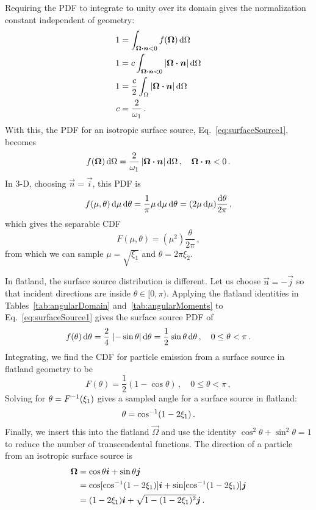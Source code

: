 Requiring the PDF to integrate to unity over its domain gives the
normalization constant independent of geometry:
\begin{align*}
  1 &= \int_{\bm{\Omega}\bm{\cdot} \bm{n} < 0} f(\bm{\Omega}) \mathop{}\!\mathrm{d}\Omega
  \\
  1 &= c \int_{\bm{\Omega}\bm{\cdot} \bm{n} < 0} \left| \bm{\Omega}\bm{\cdot} \bm{n} \right|
    \mathop{}\!\mathrm{d}\Omega
  \\
  1 &=\frac{c}{2} \int_{\Omega} \left| \bm{\Omega}\bm{\cdot} \bm{n} \right| \mathop{}\!\mathrm{d}\Omega
  \\
  c &= \frac{2}{\omega_1}\,.
\end{align*}
With this, the PDF for an isotropic surface source,
Eq.~\eqref{eq:surfaceSource1}, becomes
\begin{equation}\label{eq:surfaceSource2}
  f(\bm{\Omega}) \mathop{}\!\mathrm{d} \Omega = \frac{2}{\omega_1} \left| \bm{\Omega}\bm{\cdot} \bm{n} \right| \mathop{}\!\mathrm{d} \Omega \,,
\quad \bm{\Omega}\bm{\cdot} \bm{n} < 0 \,.
\end{equation}
In 3-D, choosing $\vec{n}=\vec{i}$, this PDF is
\begin{equation*}
  f(\mu,\theta) \mathop{}\!\mathrm{d}\mu \mathop{}\!\mathrm{d}\theta
  = \frac{1}{\pi} \mu \mathop{}\!\mathrm{d}\mu \mathop{}\!\mathrm{d}\theta
  = (2 \mu \mathop{}\!\mathrm{d}\mu) \frac{\mathop{}\!\mathrm{d}\theta}{2\pi}\,,
\end{equation*}
which gives the separable CDF
\begin{equation*}
  F(\mu,\theta) = (\mu^2) \frac{\theta}{2\pi}\,,
\end{equation*}
from which we can sample $\mu=\sqrt{\xi_1}$ and $\theta=2\pi \xi_2$.

In flatland, the surface source distribution is different. Let us choose
$\vec{n} = -\vec{j}$ so that incident directions are inside
$\theta \in [0, \pi)$.
Applying the flatland identities in Tables~\ref{tab:angularDomain}
and~\ref{tab:angularMoments} to Eq.~\eqref{eq:surfaceSource1} gives the surface
source PDF of
\begin{equation*}
  f(\theta) \mathop{}\!\mathrm{d}\theta = \frac{2}{4} \, \left|  -\sin \theta \right|\mathop{}\!\mathrm{d}\theta
  = \frac{1}{2} \sin \theta\mathop{}\!\mathrm{d}\theta \,,\quad 0 \le \theta < \pi\,.
\end{equation*}
Integrating, we find the CDF for particle emission from
a surface source in flatland geometry to be
\begin{equation}\label{eq:surfaceSourceFlatland}
  F(\theta) = \frac{1}{2} \left( 1-\cos\theta \right)
  \,,\quad 0 \le \theta < \pi\,,
\end{equation}
Solving for $\theta = F^{-1}(\xi_1)$ gives a sampled angle for a surface source
in flatland:
\begin{equation*}
  \theta = \cos^{-1}(1 - 2\xi_1)\,.
\end{equation*}
Finally, we insert this into the flatland $\vec{\Omega}$ and use the identity
$\cos^2 \theta + \sin^2 \theta = 1$ to reduce the number of transcendental
functions. The direction of a particle from an isotropic surface source is
\begin{align*}
  \bm{\Omega} &= \cos \theta \bm{i} + \sin \theta \bm{j} \\
  &=  \cos[ \cos^{-1}(1 - 2\xi_1) ] \bm{i} + \sin[ \cos^{-1}(1 - 2\xi_1) ] \bm{j} \\
  &= (1 - 2\xi_1) \bm{i} + \sqrt{1 - (1 - 2\xi_1)^2} \bm{j}\,.
\end{align*}

